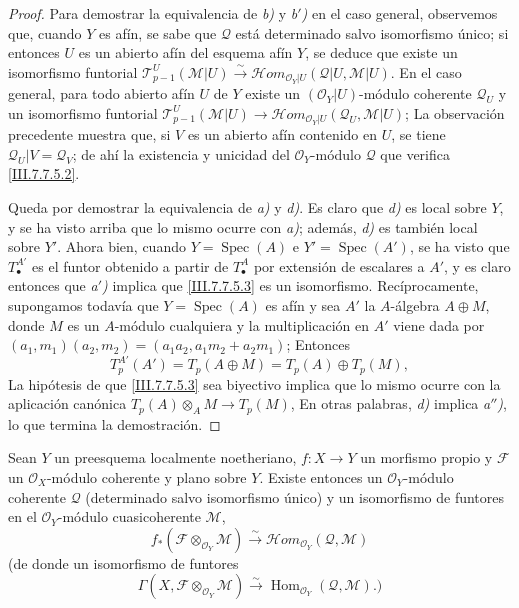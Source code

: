 \begin{proof}
Para demostrar la equivalencia de \emph{b)} y \emph{b$'$)} en el caso general, observemos que,
cuando $Y$ es afín, se sabe que $\mathscr Q$ está determinado salvo isomorfismo
único; si entonces $U$ es un abierto afín del esquema afín $Y$, se deduce que
existe un isomorfismo funtorial
$\mathscr T_{p-1}^{U}(\mathscr M|U)\xrightarrow{\sim}\mathscr{H}\!om_{\mathscr O_Y|U}(\mathscr Q|U,\mathscr M|U)$.
En el caso general, para todo abierto afín $U$ de $Y$ existe un
$(\mathscr O_Y|U)$-módulo coherente $\mathscr Q_U$ y un isomorfismo funtorial
$\mathscr T_{p-1}^{U}(\mathscr M|U)\to\mathscr{H}\!om_{\mathscr O_Y|U}(\mathscr Q_U,\mathscr M|U)$;
La observación precedente muestra que, si $V$ es un abierto afín contenido en
$U$, se tiene $\mathscr Q_U|V=\mathscr Q_V$; de ahí la existencia y unicidad
del $\mathscr O_Y$-módulo $\mathscr Q$ que verifica \eqref{III.7.7.5.2}.

Queda por demostrar la equivalencia de \emph{a)} y \emph{d)}. Es claro que \emph{d)} es local sobre
$Y$, y se ha visto arriba que lo mismo ocurre con \emph{a)}; además, \emph{d)} es también local
sobre $Y'$. Ahora bien, cuando $Y=\operatorname{Spec}(A)$ e
$Y'=\operatorname{Spec}(A')$, se ha visto que $T_\bullet^{A'}$ es el funtor obtenido
a partir de $T_\bullet^A$ por extensión de escalares a $A'$, y es claro entonces
que \emph{a$'$)} implica que \eqref{III.7.7.5.3} es un isomorfismo.
Recíprocamente, supongamos todavía que $Y=\operatorname{Spec}(A)$ es afín y sea
$A'$ la $A$-álgebra $A\oplus M$, donde $M$ es un $A$-módulo cualquiera y la
multiplicación en $A'$ viene dada por
$(a_1,m_1)(a_2,m_2)=(a_1a_2,a_1m_2+a_2m_1)$;
Entonces
\[
  T_p^{A'}(A')
  =
  T_p(A\oplus M)
  =
  T_p(A)\oplus T_p(M),
\]
La hipótesis de que \eqref{III.7.7.5.3} sea biyectivo implica que lo mismo
ocurre con la aplicación canónica
$T_p(A)\otimes_A M\longrightarrow T_p(M)$,
En otras palabras, \emph{d)} implica \emph{a$''$)}, lo que termina la demostración.
\end{proof}

\begin{theorem}[7.7.6]
\label{III.7.7.6}
Sean $Y$ un preesquema localmente noetheriano, $f:X\to Y$ un morfismo propio y
$\mathscr F$ un $\mathscr O_X$-módulo coherente y plano sobre $Y$. Existe
entonces un $\mathscr O_Y$-módulo coherente $\mathscr Q$ (determinado salvo
isomorfismo único) y un isomorfismo de funtores en el
$\mathscr O_Y$-módulo cuasicoherente $\mathscr M$,
\[
  f_*(\mathscr F\otimes_{\mathscr O_Y}\mathscr M)
  \xrightarrow{\sim}
  \mathscr{H}\!om_{\mathscr O_Y}(\mathscr Q,\mathscr M)
  \tag{7.7.6.1}\label{III.7.7.6.1.fr}
\]
\textup{(de donde un isomorfismo de funtores}
\[
  \Gamma(X,\mathscr F\otimes_{\mathscr O_Y}\mathscr M)
  \xrightarrow{\sim}
  \operatorname{Hom}_{\mathscr O_Y}(\mathscr Q,\mathscr M).)
  \tag{7.7.6.2}\label{III.7.7.6.2.fr}
\]
\end{theorem}

